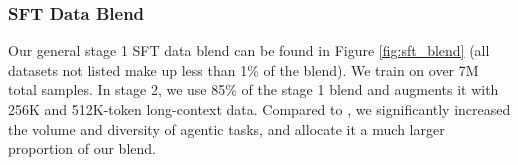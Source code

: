 


\subsubsection{SFT Data Blend}
Our general stage 1 SFT data blend can be found in Figure \ref{fig:sft_blend} (all datasets not listed make up less than 1\% of the blend). We train on over 7M total samples. In stage 2, we use 85\% of the stage 1 blend and augments it with 256K and 512K-token long-context data. Compared to \nanomodel, we  significantly increased the volume and diversity of agentic tasks, and allocate it a much larger proportion of our blend.

